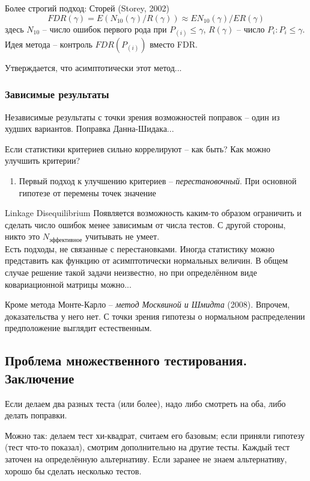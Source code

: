 \documentclass[main.tex]{subfiles}
\begin{document}
Более строгий подход: Сторей (Storey, 2002)
\[ FDR(\gamma) = E(N_{10}(\gamma)/R(\gamma)) \approx EN_{10}(\gamma) / ER(\gamma) \]
здесь $ N_{10} $ -- число ошибок первого рода при $ P_{(i)} \le \gamma $, $ R(\gamma) $ -- число $ P_i : P_i \le \gamma $.
Идея метода -- контроль $ FDR(P_{(i)}) $ вместо FDR.

Утверждается, что асимптотически этот метод...


\subsubsection{Зависимые результаты}

Независимые результаты с точки зрения возможностей поправок -- один из худших вариантов.
Поправка Данна-Шидака...

Если статистики критериев сильно коррелируют -- как быть?
Как можно улучшить критерии?

\begin{enumerate}
	\item  Первый подход к улучшению критериев -- \emph{перестановочный}.
	При основной гипотезе от перемены точек значение
\end{enumerate}

Linkage Disequilibrium
Появляется возможность каким-то образом ограничить и сделать число ошибок менее зависимым от числа тестов.
С другой стороны, никто это $N_{\text{эффективное}}$ учитывать не умеет. \\

Есть подходы, не связанные с перестановками.
Иногда статистику можно представить как функцию от асимптотически нормальных величин.
В общем случае решение такой задачи неизвестно, но при определённом виде ковариационной матрицы можно...

Кроме метода Монте-Карло --  \emph{метод Москвиной и Шмидта} (2008).
Впрочем, доказательства у него нет.
С точки зрения гипотезы о нормальном распределении предположение выглядит естественным.

\subsection{ Проблема множественного тестирования. Заключение }

Если делаем два разных теста (или более), надо либо смотреть на оба, либо делать поправки.

Можно так: делаем тест хи-квадрат, считаем его базовым; если приняли гипотезу (тест что-то показал), смотрим дополнительно на другие тесты.
Каждый тест заточен на определённую альтернативу.
Если заранее не знаем альтернативу, хорошо бы сделать несколько тестов.
\end{document}
